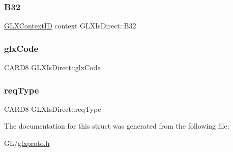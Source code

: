 \subsubsection{\texorpdfstring{B32}{B32}}
{\footnotesize\ttfamily \hyperlink{glx_8h_a17c7ca5b76cc448032df0b5352803005}{G\+L\+X\+Context\+ID} context G\+L\+X\+Is\+Direct\+::\+B32}

\mbox{\label{struct_g_l_x_is_direct_aadd8f7190c5dda50e7132f692ddcbcb2}} 
\subsubsection{\texorpdfstring{glx\+Code}{glxCode}}
{\footnotesize\ttfamily C\+A\+R\+D8 G\+L\+X\+Is\+Direct\+::glx\+Code}

\mbox{\label{struct_g_l_x_is_direct_a01c05b7e69d2894b5b8c52e544acd4af}} 
\subsubsection{\texorpdfstring{req\+Type}{reqType}}
{\footnotesize\ttfamily C\+A\+R\+D8 G\+L\+X\+Is\+Direct\+::req\+Type}



The documentation for this struct was generated from the following file\+:\begin{DoxyCompactItemize}
\item 
G\+L/\hyperlink{glxproto_8h}{glxproto.\+h}\end{DoxyCompactItemize}
